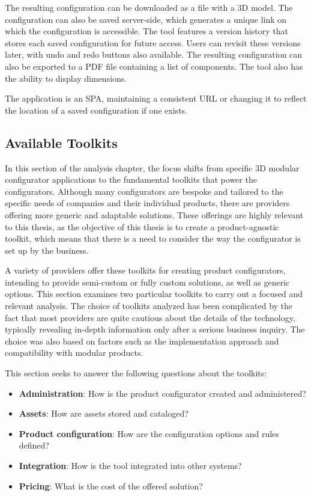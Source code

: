 The resulting configuration can be downloaded as a file with a 3D model. The configuration can also be saved server-side, which generates a unique link on which the configuration is accessible. The tool features a version history that stores each saved configuration for future access. Users can revisit these versions later, with undo and redo buttons also available. The resulting configuration can also be exported to a PDF file containing a list of components. The tool also has the ability to display dimensions.

The application is an SPA, maintaining a consistent URL or changing it to reflect the location of a saved configuration if one exists.


\subsection{Available Toolkits}

In this section of the analysis chapter, the focus shifts from specific 3D modular configurator applications to the fundamental toolkits that power the configurators. Although many configurators are bespoke and tailored to the specific needs of companies and their individual products, there are providers offering more generic and adaptable solutions. These offerings are highly relevant to this thesis, as the objective of this thesis is to create a product-agnostic toolkit, which means that there is a need to consider the way the configurator is set up by the business.

A variety of providers offer these toolkits for creating product configurators, intending to provide semi-custom or fully custom solutions, as well as generic options. This section examines two particular toolkits to carry out a focused and relevant analysis. The choice of toolkits analyzed has been complicated by the fact that most providers are quite cautious about the details of the technology, typically revealing in-depth information only after a serious business inquiry. The choice was also based on factors such as the implementation approach and compatibility with modular products.

\noindent This section seeks to answer the following questions about the toolkits: 
\begin{itemize}[label=\rectanglebullet]
    \item \textbf{Administration}: How is the product configurator created and administered?
    \item \textbf{Assets}: How are assets stored and cataloged?
    \item \textbf{Product configuration}: How are the configuration options and rules defined?
    \item \textbf{Integration}: How is the tool integrated into other systems?
    \item \textbf{Pricing}: What is the cost of the offered solution?
\end{itemize}
